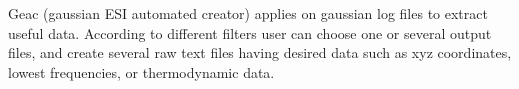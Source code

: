 Geac (gaussian ESI automated creator) applies on gaussian log files to extract useful data. According to different filters user can choose one or several output files, and create several raw text files having desired data such as xyz coordinates, lowest frequencies, or thermodynamic data.